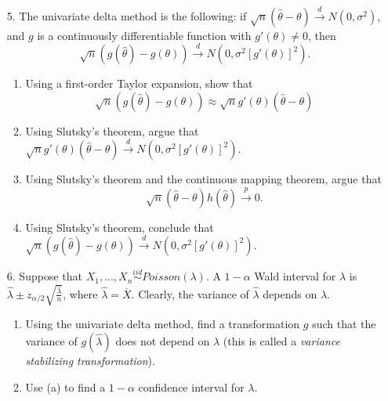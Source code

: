 \documentclass[11pt]{article}
\begin{document}
\begin{enumerate}
\item[5.] The univariate delta method is the following: if $\sqrt{n}(\widehat{\theta} - \theta) \overset{d}{\to} N(0, \sigma^2)$, and $g$ is a continuously differentiable function with $g'(\theta) \neq 0$, then
$$\sqrt{n}(g(\widehat{\theta}) - g(\theta)) \overset{d}{\to} N(0, \sigma^2 [g'(\theta)]^2).$$

\begin{enumerate}
\item Using a first-order Taylor expansion, show that
$$\sqrt{n}(g(\widehat{\theta}) - g(\theta)) \approx \sqrt{n}g'(\theta)(\widehat{\theta} - \theta)$$

\item Using Slutsky's theorem, argue that $\sqrt{n} g'(\theta)(\widehat{\theta} - \theta) \overset{d}{\to} N(0, \sigma^2 [g'(\theta)]^2)$.

\item Using Slutsky's theorem and the continuous mapping theorem, argue that $$\sqrt{n}(\widehat{\theta} - \theta) h(\widehat{\theta}) \overset{p}{\to} 0.$$

\item Using Slutsky's theorem, conclude that $\sqrt{n}(g(\widehat{\theta}) - g(\theta)) \overset{d}{\to} N(0, \sigma^2 [g'(\theta)]^2)$.
\end{enumerate}

\item[6.] Suppose that $X_1,...,X_n \overset{iid}{\sim} Poisson(\lambda)$. A $1 - \alpha$ Wald interval for $\lambda$ is $\widehat{\lambda} \pm z_{\alpha/2} \sqrt{\frac{\widehat{\lambda}}{n}}$, where $\widehat{\lambda} = \overline{X}$. Clearly, the variance of $\widehat{\lambda}$ depends on $\lambda$. 

\begin{enumerate}
\item Using the univariate delta method, find a transformation $g$ such that the variance of $g(\widehat{\lambda})$ does not depend on $\lambda$ (this is called a \textit{variance stabilizing transformation}).

\item Use (a) to find a $1 - \alpha$ confidence interval for $\lambda$.
\end{enumerate}

\end{enumerate}
\end{document}
